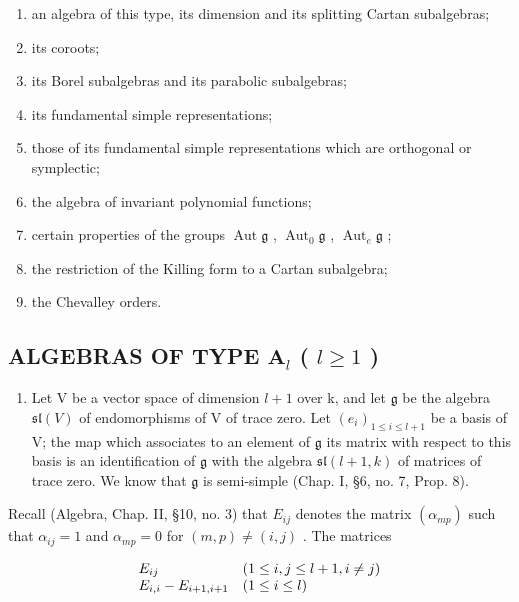 \begin{enumerate}
\def\labelenumi{(\Roman{enumi})}
\item
  an algebra of this type, its dimension and its splitting Cartan subalgebras;
\item
  its coroots;
\item
  its Borel subalgebras and its parabolic subalgebras;
\item
  its fundamental simple representations;
\item
  those of its fundamental simple representations which are orthogonal or symplectic;
\item
  the algebra of invariant polynomial functions;
\item
  certain properties of the groups \(\operatorname{Aut} \mathfrak{g}\) , \(\operatorname{Aut}_0 \mathfrak{g}\) , \(\operatorname{Aut}_e \mathfrak{g}\) ;
\item
  the restriction of the Killing form to a Cartan subalgebra;
\item
  the Chevalley orders.
\end{enumerate}

\subsection{\texorpdfstring{ALGEBRAS OF TYPE \(\mathbf{A}_l\) ( \(l \geq 1\) )}{ALGEBRAS OF TYPE \textbackslash mathbf\{A\}\_l ( l \textbackslash geq 1 )}}

\begin{enumerate}
\def\labelenumi{(\Roman{enumi})}
\tightlist
\item
  Let V be a vector space of dimension \(l+1\) over k, and let \(\mathfrak{g}\) be the algebra \(\mathfrak{sl}(V)\) of endomorphisms of V of trace zero. Let \((e_{i})_{1\leq i\leq l+1}\) be a basis of V; the map which associates to an element of \(\mathfrak{g}\) its matrix with respect to this basis is an identification of \(\mathfrak{g}\) with the algebra \(\mathfrak{sl}(l+1,k)\) of matrices of trace zero. We know that \(\mathfrak{g}\) is semi-simple (Chap. I, §6, no. 7, Prop. 8).
\end{enumerate}

Recall (Algebra, Chap. II, §10, no. 3) that \(E_{ij}\) denotes the matrix \((\alpha_{mp})\) such that \(\alpha_{ij} = 1\) and \(\alpha_{mp} = 0\) for \((m,p) \neq (i,j)\) . The matrices

\[
\begin{array}{l l} E _ {i j} & (1 \leq i, j \leq l + 1, i \neq j) \\ E _ {i, i} - E _ {i + 1, i + 1} & (1 \leq i \leq l) \end{array}
\]


